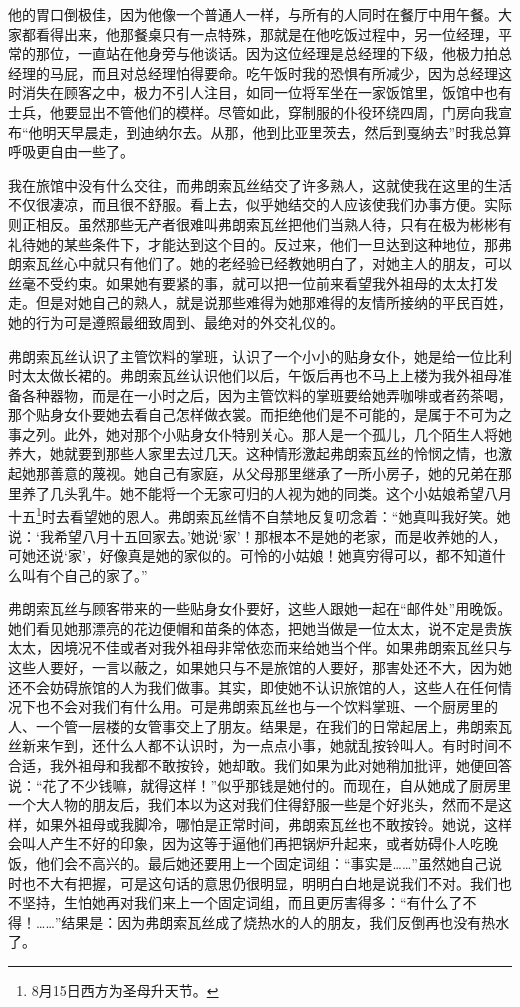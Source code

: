 \par 他的胃口倒极佳，因为他像一个普通人一样，与所有的人同时在餐厅中用午餐。大家都看得出来，他那餐桌只有一点特殊，那就是在他吃饭过程中，另一位经理，平常的那位，一直站在他身旁与他谈话。因为这位经理是总经理的下级，他极力拍总经理的马屁，而且对总经理怕得要命。吃午饭时我的恐惧有所减少，因为总经理这时消失在顾客之中，极力不引人注目，如同一位将军坐在一家饭馆里，饭馆中也有士兵，他要显出不管他们的模样。尽管如此，穿制服的仆役环绕四周，门房向我宣布“他明天早晨走，到迪纳尔去。从那，他到比亚里茨去，然后到戛纳去”时我总算呼吸更自由一些了。
\par 我在旅馆中没有什么交往，而弗朗索瓦丝结交了许多熟人，这就使我在这里的生活不仅很凄凉，而且很不舒服。看上去，似乎她结交的人应该使我们办事方便。实际则正相反。虽然那些无产者很难叫弗朗索瓦丝把他们当熟人待，只有在极为彬彬有礼待她的某些条件下，才能达到这个目的。反过来，他们一旦达到这种地位，那弗朗索瓦丝心中就只有他们了。她的老经验已经教她明白了，对她主人的朋友，可以丝毫不受约束。如果她有要紧的事，就可以把一位前来看望我外祖母的太太打发走。但是对她自己的熟人，就是说那些难得为她那难得的友情所接纳的平民百姓，她的行为可是遵照最细致周到、最绝对的外交礼仪的。
\par 弗朗索瓦丝认识了主管饮料的掌班，认识了一个小小的贴身女仆，她是给一位比利时太太做长裙的。弗朗索瓦丝认识他们以后，午饭后再也不马上上楼为我外祖母准备各种器物，而是在一小时之后，因为主管饮料的掌班要给她弄咖啡或者药茶喝，那个贴身女仆要她去看自己怎样做衣裳。而拒绝他们是不可能的，是属于不可为之事之列。此外，她对那个小贴身女仆特别关心。那人是一个孤儿，几个陌生人将她养大，她就要到那些人家里去过几天。这种情形激起弗朗索瓦丝的怜悯之情，也激起她那善意的蔑视。她自己有家庭，从父母那里继承了一所小房子，她的兄弟在那里养了几头乳牛。她不能将一个无家可归的人视为她的同类。这个小姑娘希望八月十五\footnote{8月15日西方为圣母升天节。}时去看望她的恩人。弗朗索瓦丝情不自禁地反复叨念着：“她真叫我好笑。她说：‘我希望八月十五回家去。’她说‘家’！那根本不是她的老家，而是收养她的人，可她还说‘家’，好像真是她的家似的。可怜的小姑娘！她真穷得可以，都不知道什么叫有个自己的家了。”
\par 弗朗索瓦丝与顾客带来的一些贴身女仆要好，这些人跟她一起在“邮件处”用晚饭。她们看见她那漂亮的花边便帽和苗条的体态，把她当做是一位太太，说不定是贵族太太，因境况不佳或者对我外祖母非常依恋而来给她当个伴。如果弗朗索瓦丝只与这些人要好，一言以蔽之，如果她只与不是旅馆的人要好，那害处还不大，因为她还不会妨碍旅馆的人为我们做事。其实，即使她不认识旅馆的人，这些人在任何情况下也不会对我们有什么用。可是弗朗索瓦丝也与一个饮料掌班、一个厨房里的人、一个管一层楼的女管事交上了朋友。结果是，在我们的日常起居上，弗朗索瓦丝新来乍到，还什么人都不认识时，为一点点小事，她就乱按铃叫人。有时时间不合适，我外祖母和我都不敢按铃，她却敢。我们如果为此对她稍加批评，她便回答说：“花了不少钱嘛，就得这样！”似乎那钱是她付的。而现在，自从她成了厨房里一个大人物的朋友后，我们本以为这对我们住得舒服一些是个好兆头，然而不是这样，如果外祖母或我脚冷，哪怕是正常时间，弗朗索瓦丝也不敢按铃。她说，这样会叫人产生不好的印象，因为这等于逼他们再把锅炉升起来，或者妨碍仆人吃晚饭，他们会不高兴的。最后她还要用上一个固定词组：“事实是……”虽然她自己说时也不大有把握，可是这句话的意思仍很明显，明明白白地是说我们不对。我们也不坚持，生怕她再对我们来上一个固定词组，而且更厉害得多：“有什么了不得！……”结果是：因为弗朗索瓦丝成了烧热水的人的朋友，我们反倒再也没有热水了。
